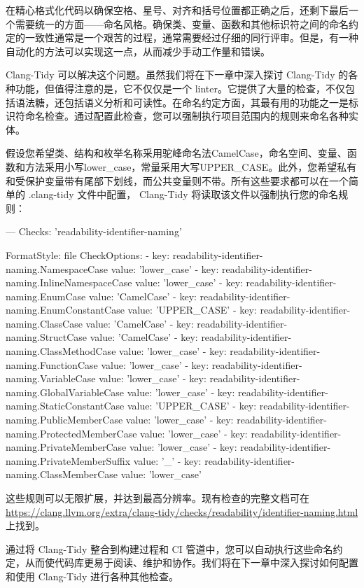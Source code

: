 在精心格式化代码以确保空格、星号、对齐和括号位置都正确之后，还剩下最后一个需要统一的方面——命名风格。确保类、变量、函数和其他标识符之间的命名约定的一致性通常是一个艰苦的过程，通常需要经过仔细的同行评审。但是，有一种自动化的方法可以实现这一点，从而减少手动工作量和错误。

Clang-Tidy 可以解决这个问题。虽然我们将在下一章中深入探讨 Clang-Tidy 的各种功能，但值得注意的是，它不仅仅是一个 linter。它提供了大量的检查，不仅包括语法糖，还包括语义分析和可读性。在命名约定方面，其最有用的功能之一是标识符命名检查。通过配置此检查，您可以强制执行项目范围内的规则来命名各种实体。

假设您希望类、结构和枚举名称采用驼峰命名法CamelCase，命名空间、变量、函数和方法采用小写lower\_case，常量采用大写UPPER\_CASE。此外，您希望私有和受保护变量带有尾部下划线，而公共变量则不带。所有这些要求都可以在一个简单的 .clang-tidy 文件中配置， Clang-Tidy 将读取该文件以强制执行您的命名规则：

\begin{shell}
---
Checks: 'readability-identifier-naming'

FormatStyle: file
CheckOptions:
    - key: readability-identifier-naming.NamespaceCase
      value: 'lower_case'
    - key: readability-identifier-naming.InlineNamespaceCase
      value: 'lower_case'
    - key: readability-identifier-naming.EnumCase
      value: 'CamelCase'
    - key: readability-identifier-naming.EnumConstantCase
      value: 'UPPER_CASE'
    - key: readability-identifier-naming.ClassCase
      value: 'CamelCase'
    - key: readability-identifier-naming.StructCase
      value: 'CamelCase'
    - key: readability-identifier-naming.ClassMethodCase
      value: 'lower_case'
    - key: readability-identifier-naming.FunctionCase
      value: 'lower_case'
    - key: readability-identifier-naming.VariableCase
      value: 'lower_case'
    - key: readability-identifier-naming.GlobalVariableCase
      value: 'lower_case'
    - key: readability-identifier-naming.StaticConstantCase
      value: 'UPPER_CASE'
    - key: readability-identifier-naming.PublicMemberCase
      value: 'lower_case'
    - key: readability-identifier-naming.ProtectedMemberCase
      value: 'lower_case'
    - key: readability-identifier-naming.PrivateMemberCase
      value: 'lower_case'
    - key: readability-identifier-naming.PrivateMemberSuffix
      value: '_'
    - key: readability-identifier-naming.ClassMemberCase
      value: 'lower_case'
\end{shell}

这些规则可以无限扩展，并达到最高分辨率。现有检查的完整文档可在 \url{https://clang.llvm.org/extra/clang-tidy/checks/readability/identifier-naming.html} 上找到。

通过将 Clang-Tidy 整合到构建过程和 CI 管道中，您可以自动执行这些命名约定，从而使代码库更易于阅读、维护和协作。我们将在下一章中深入探讨如何配置和使用 Clang-Tidy 进行各种其他检查。








